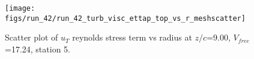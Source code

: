 \begin{figure}[H]
\centering
\texttt{[image: figs/run\_42/run\_42\_turb\_visc\_ettap\_top\_vs\_r\_meshscatter]}
\caption{Scatter plot of $
u_T$ reynolds stress term vs radius at $z/c$=9.00, $V_{free}$=17.24, station 5.}
\label{fig:run_42_turb_visc_ettap_top_vs_r_meshscatter}
\end{figure}


